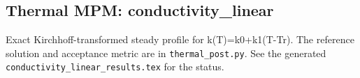\subsection{Thermal MPM: conductivity\_linear}
Exact Kirchhoff-transformed steady profile for k(T)=k0+k1(T-Tr). The reference solution and acceptance metric are in \texttt{thermal\_post.py}. See the generated \texttt{conductivity\_linear\_results.tex} for the status.
